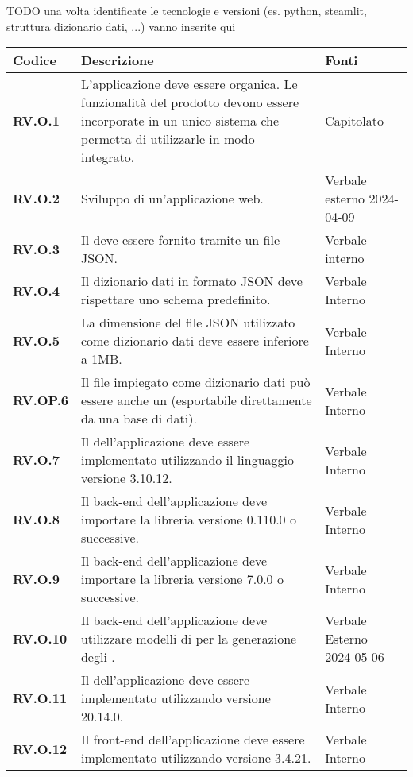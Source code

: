 TODO una volta identificate le tecnologie e versioni (es. python, steamlit, struttura dizionario dati, ...) vanno inserite qui
\begin{longtable}{|P{3cm}|P{6,5cm}|>{\arraybackslash}P{4cm}|}
  \hline
  \textbf{Codice} & \textbf{Descrizione} & \textbf{Fonti} \\
  \hline
  \textbf{RV.O.1} & L'applicazione deve essere organica. Le funzionalità del prodotto devono essere incorporate in un unico sistema che permetta di utilizzarle in modo integrato. & Capitolato \\
  \hline
  \textbf{RV.O.2} & Sviluppo di un'applicazione web. & Verbale esterno 2024-04-09 \\
  \hline
  \textbf{RV.O.3} & Il  deve essere fornito tramite un file JSON. & Verbale interno \\
  \hline
  \textbf{RV.O.4} & Il dizionario dati in formato JSON deve rispettare uno schema predefinito. & Verbale Interno \\
  \hline
  \textbf{RV.O.5} & La dimensione del file JSON utilizzato come dizionario dati deve essere inferiore a 1MB. & Verbale Interno \\
  \hline
  \textbf{RV.OP.6} & Il file impiegato come dizionario dati può essere anche un  (esportabile direttamente da una base di dati). & Verbale Interno \\
  \hline
  \textbf{RV.O.7} & Il  dell'applicazione deve essere implementato utilizzando il linguaggio  versione 3.10.12. & Verbale Interno \\
  \hline
  \textbf{RV.O.8} & Il back-end dell'applicazione deve importare la libreria  versione 0.110.0 o successive. & Verbale Interno \\
  \hline
  \textbf{RV.O.9} & Il back-end dell'applicazione deve importare la libreria  versione 7.0.0 o successive. & Verbale Interno \\
  \hline
  \textbf{RV.O.10} & Il back-end dell'applicazione deve utilizzare modelli di  per la generazione degli . & Verbale Esterno 2024-05-06 \\
  \hline
  \textbf{RV.O.11} & Il  dell'applicazione deve essere implementato utilizzando  versione 20.14.0. & Verbale Interno \\
  \hline
  \textbf{RV.O.12} & Il front-end dell'applicazione deve essere implementato utilizzando  versione 3.4.21. & Verbale Interno \\

\end{longtable}
